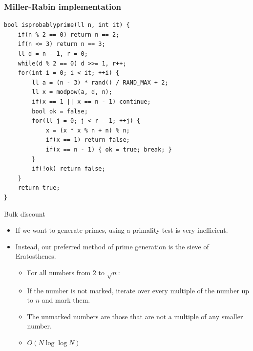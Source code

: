 \documentclass{beamer}
\begin{document}
\begin{frame}
\frametitle{Miller-Rabin implementation}

\begin{small}
\begin{verbatim}
bool isprobablyprime(ll n, int it) {
    if(n % 2 == 0) return n == 2;
    if(n <= 3) return n == 3;
    ll d = n - 1, r = 0;
    while(d % 2 == 0) d >>= 1, r++;
    for(int i = 0; i < it; ++i) {
        ll a = (n - 3) * rand() / RAND_MAX + 2;
        ll x = modpow(a, d, n);
        if(x == 1 || x == n - 1) continue;
        bool ok = false;
        for(ll j = 0; j < r - 1; ++j) {
            x = (x * x % n + n) % n;
            if(x == 1) return false;
            if(x == n - 1) { ok = true; break; }
        }
        if(!ok) return false;
    }
    return true;
}
\end{verbatim}
\end{small}

\end{frame}

\begin{frame}{Bulk discount}
  \begin{itemize}
    \item If we want to generate primes, using a primality test is very inefficient.
    \item Instead, our preferred method of prime generation is the sieve of Eratosthenes.
      \begin{itemize}
        \item For all numbers from $2$ to $\sqrt{n}$:
        \item If the number is not marked, iterate over every multiple of the
          number up to $n$ and mark them.
        \item The unmarked numbers are those that are not a multiple of any
          smaller number.
        \item $O(N\log \log N)$
      \end{itemize}
  \end{itemize}
\end{frame}
\end{document}
